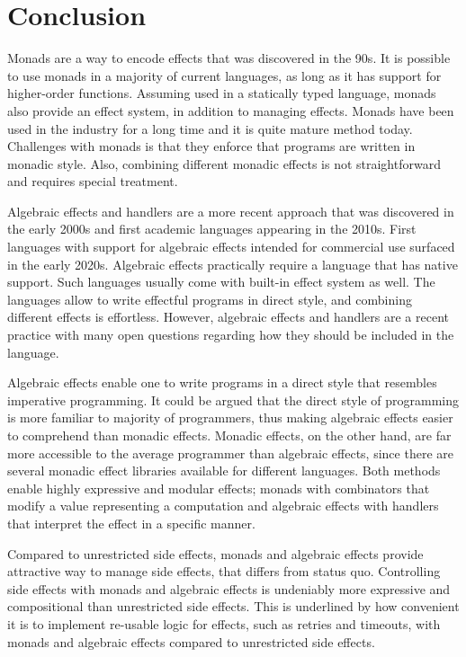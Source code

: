 \chapter{Conclusion}

Monads are a way to encode effects that was discovered in the 90s. It is possible to use monads in a majority of current languages, as long as it has support for higher-order functions. Assuming used in a statically typed language, monads also provide an effect system, in addition to managing effects. Monads have been used in the industry for a long time and it is quite mature method today. Challenges with monads is that they enforce that programs are written in monadic style. Also, combining different monadic effects is not straightforward and requires special treatment.

Algebraic effects and handlers are a more recent approach that was discovered in the early 2000s and first academic languages appearing in the 2010s. First languages with support for algebraic effects intended for commercial use surfaced in the early 2020s. Algebraic effects practically require a language that has native support. Such languages usually come with built-in effect system as well. The languages allow to write effectful programs in direct style, and combining different effects is effortless. However, algebraic effects and handlers are a recent practice with many open questions regarding how they should be included in the language.

Algebraic effects enable one to write programs in a direct style that resembles imperative programming. It could be argued that the direct style of programming is more familiar to majority of programmers, thus making algebraic effects easier to comprehend than monadic effects. Monadic effects, on the other hand, are far more accessible to the average programmer than algebraic effects, since there are several monadic effect libraries available for different languages. Both methods enable highly expressive and modular effects; monads with combinators that modify a value representing a computation and algebraic effects with handlers that interpret the effect in a specific manner. 

Compared to unrestricted side effects, monads and algebraic effects provide attractive way to manage side effects, that differs from status quo. Controlling side effects with monads and algebraic effects is undeniably more expressive and compositional than unrestricted side effects. This is underlined by how convenient it is to implement re-usable logic for effects, such as retries and timeouts, with monads and algebraic effects compared to unrestricted side effects.

